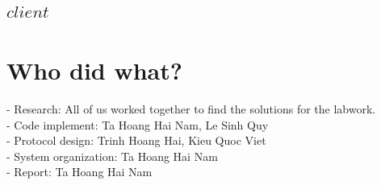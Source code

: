 \documentclass[10.5pt,a4paper]{article}
\begin{document}
\subsection*{$client$}

\section{Who did what?}
- Research: All of us worked together to find the solutions for the labwork. \\
- Code implement: Ta Hoang Hai Nam, Le Sinh Quy \\
- Protocol design: Trinh Hoang Hai, Kieu Quoc Viet \\ 
- System organization:  Ta Hoang Hai Nam \\
- Report: Ta Hoang Hai Nam
\end{document}
